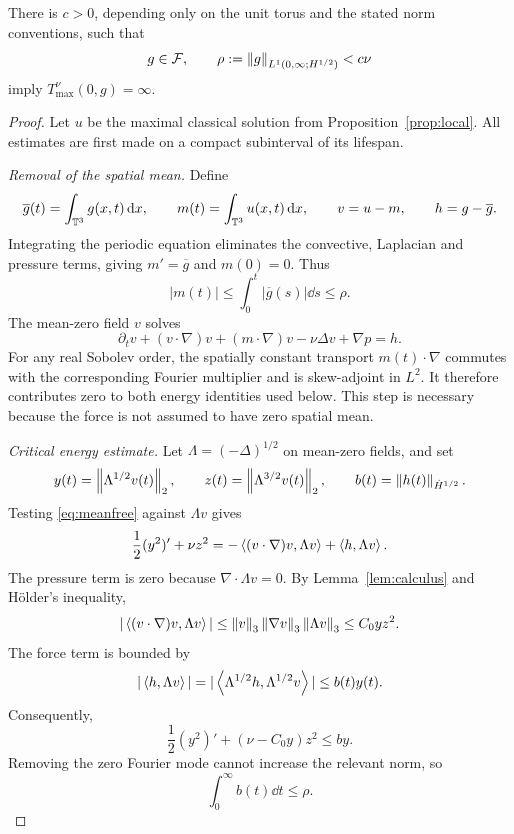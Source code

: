 \begin{proposition}\label{prop:critical}
There is $c>0$, depending only on the unit torus and the stated norm conventions, such that
\begin{equation}\label{eq:smallcritical}
 g\in\mathcal F,\qquad
 \rho:=\left\lVert g\right\rVert_{L^1(0,\infty;H^{1/2})}<c\nu
\end{equation}
imply $T_{\max}^{\nu}(0,g)=\infty$.
\end{proposition}
\begin{proof}
Let $u$ be the maximal classical solution from Proposition~\ref{prop:local}.
All estimates are first made on a compact subinterval of its lifespan.

\emph{Removal of the spatial mean.}
Define
\[
 \overline g(t)=\int_{\mathbb T^3}g(x,t)\,\mathrm d x,\qquad
 m(t)=\int_{\mathbb T^3}u(x,t)\,\mathrm d x,\qquad
 v=u-m,\qquad h=g-\overline g.
\]
Integrating the periodic equation eliminates the convective, Laplacian and pressure terms, giving
$m'=\overline g$ and $m(0)=0$. Thus
\begin{equation}\label{eq:meanbound}
 |m(t)|\le\int_0^t|\overline g(s)|\dd s\le\rho.
\end{equation}
The mean-zero field $v$ solves
\begin{equation}\label{eq:meanfree}
 \partial_tv+(v\cdot\nabla)v+(m\cdot\nabla)v-\nu\Delta v+\nabla p=h.
\end{equation}
For any real Sobolev order, the spatially constant transport $m(t)\cdot\nabla$ commutes with the corresponding Fourier multiplier and is skew-adjoint in $L^2$. It therefore contributes zero to both energy identities used below. This step is necessary because the force is not assumed to have zero spatial mean.

\emph{Critical energy estimate.}
Let $\Lambda=(-\Delta)^{1/2}$ on mean-zero fields, and set
\[
 y(t)=\left\lVert\Lambda^{1/2}v(t)\right\rVert_2,\qquad
 z(t)=\left\lVert\Lambda^{3/2}v(t)\right\rVert_2,\qquad
 b(t)=\left\lVert h(t)\right\rVert_{\dot H^{1/2}}.
\]
Testing \eqref{eq:meanfree} against $\Lambda v$ gives
\[
 \frac12(y^2)'+\nu z^2
 =-\left\langle(v\cdot\nabla)v,\Lambda v\right\rangle+\left\langle h,\Lambda v\right\rangle.
\]
The pressure term is zero because $\nabla\cdot\Lambda v=0$.
By Lemma~\ref{lem:calculus} and H\"older's inequality,
\[
 |\left\langle(v\cdot\nabla)v,\Lambda v\right\rangle|
 \le\left\lVert v\right\rVert_3\left\lVert\nabla v\right\rVert_3\left\lVert\Lambda v\right\rVert_3
 \le C_0yz^2.
\]
The force term is bounded by
\[
 |\left\langle h,\Lambda v\right\rangle|
 =|\left\langle\Lambda^{1/2}h,\Lambda^{1/2}v\right\rangle|\le b(t)y(t).
\]
Consequently,
\begin{equation}\label{eq:criticalenergy}
 \frac12(y^2)'+(\nu-C_0y)z^2\le by.
\end{equation}
Removing the zero Fourier mode cannot increase the relevant norm, so
\begin{equation}\label{eq:bintegral}
 \int_0^\infty b(t)\dd t\le\rho.
\end{equation}


\end{proof}
